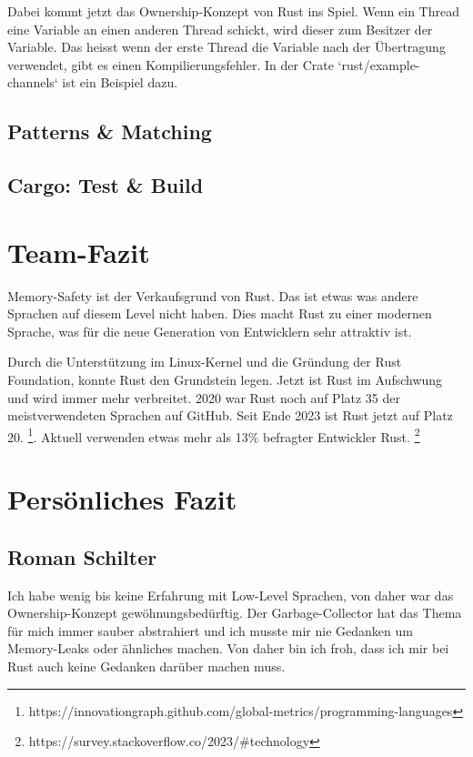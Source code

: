 \documentclass[letterpaper,12pt]{article}
\begin{document}
    Dabei kommt jetzt das Ownership-Konzept von Rust ins Spiel.
    Wenn ein Thread eine Variable an einen anderen Thread schickt, wird dieser zum Besitzer der Variable.
    Das heisst wenn der erste Thread die Variable nach der Übertragung verwendet, gibt es einen Kompilierungsfehler.
    In der Crate `rust/example-channels` ist ein Beispiel dazu.

    \subsection{Patterns \& Matching}\label{subsec:patterns-&-matching}

    \subsection{Cargo: Test \& Build}\label{subsec:cargo:-test-&-build}


    \section{Team-Fazit}\label{sec:team-fazit}
    Memory-Safety ist der Verkaufsgrund von Rust.
    Das ist etwas was andere Sprachen auf diesem Level nicht haben.
    Dies macht Rust zu einer modernen Sprache, was für die neue Generation von Entwicklern sehr attraktiv ist.

    Durch die Unterstützung im Linux-Kernel und die Gründung der Rust Foundation, konnte Rust den Grundstein legen.
    Jetzt ist Rust im Aufschwung und wird immer mehr verbreitet.
    2020 war Rust noch auf Platz 35 der meistverwendeten Sprachen auf GitHub.
    Seit Ende 2023 ist Rust jetzt auf Platz 20. \footnote{https://innovationgraph.github.com/global-metrics/programming-languages}.
    Aktuell verwenden etwas mehr als 13\% befragter Entwickler Rust. \footnote{https://survey.stackoverflow.co/2023/\#technology}


    \section{Persönliches Fazit}\label{sec:personliches-fazit}

    \subsection{Roman Schilter}\label{subsec:roman}
    Ich habe wenig bis keine Erfahrung mit Low-Level Sprachen, von daher war das Ownership-Konzept gewöhnungsbedürftig.
    Der Garbage-Collector hat das Thema für mich immer sauber abstrahiert und ich musste mir nie Gedanken um Memory-Leaks oder ähnliches machen.
    Von daher bin ich froh, dass ich mir bei Rust auch keine Gedanken darüber machen muss.
\end{document}

